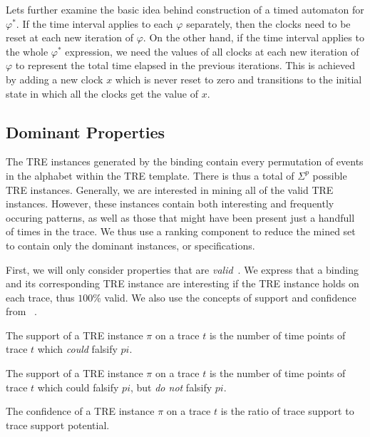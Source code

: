\documentclass[]{sigplanconf}
\begin{document}
Lets further examine the basic idea behind construction of a timed automaton for $\varphi^*$. If the time interval applies to each $\varphi$ separately, then the clocks need to be reset at each new iteration of $\varphi$. On the other hand, if the time interval applies to the whole $\varphi^*$ expression, we need the values of all clocks at each new iteration of $\varphi$ to represent the total time elapsed in the previous iterations. This is achieved by adding a new clock $x$ which is never reset to zero and transitions to the initial state in which all the clocks get the value of $x$.


\subsection{Dominant Properties}

The TRE instances generated by the binding contain every permutation of events in the alphabet within the TRE template. There is thus a total of $\Sigma^p$ possible TRE instances. Generally, we are interested in mining all of the valid TRE instances.
However, these instances contain both interesting and frequently occuring patterns, as well as those that might have been present just a handfull of times in the trace. We thus use a ranking component to reduce the mined set to contain only the dominant instances, or specifications.

First, we will only consider properties that are \emph{valid}~\cite{lemieux2015general}. We express that a binding and its corresponding TRE instance are interesting if the TRE instance holds on each trace, thus $100 \%$ valid. We also use the concepts of support and confidence from ~\cite{lemieux2015general}.

\begin{defns}
The support of a TRE instance $\pi$ on a trace $t$ is the number of time points of trace $t$ which \emph{could} falsify $pi$.
\end{defns}

\begin{defns}[Support]
The support of a TRE instance $\pi$ on a trace $t$ is the number of time points of trace $t$ which could falsify $pi$, but \emph{do not} falsify $pi$.
\end{defns}

\begin{defns}[Confidence]
The confidence of a TRE instance $\pi$ on a trace $t$ is the ratio of trace support to trace support potential.
\end{defns}
\end{document}
